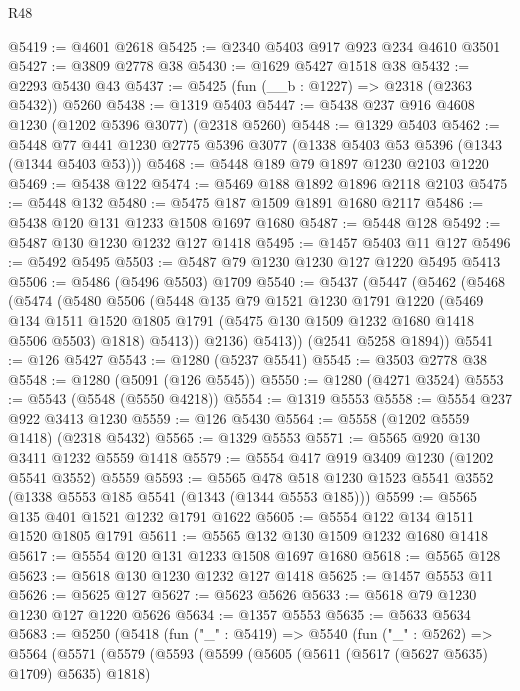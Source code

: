 \begin{lexlean}{R48}
\begin{coremodule}
@5419 := @4601 @2618
@5425 := @2340 @5403 @917 @923 @234 @4610 @3501
@5427 := @3809 @2778 @38
@5430 := @1629 @5427 @1518 @38
@5432 := @2293 @5430 @43
@5437 := @5425 (fun (__b : @1227) => @2318 (@2363 @5432)) @5260
@5438 := @1319 @5403
@5447 := @5438 @237 @916 @4608 @1230 (@1202 @5396 @3077) (@2318 @5260)
@5448 := @1329 @5403
@5462 := @5448 @77 @441 @1230 @2775 @5396 @3077 (@1338 @5403 @53 @5396 (@1343 (@1344 @5403 @53)))
@5468 := @5448 @189 @79 @1897 @1230 @2103 @1220
@5469 := @5438 @122
@5474 := @5469 @188 @1892 @1896 @2118 @2103
@5475 := @5448 @132
@5480 := @5475 @187 @1509 @1891 @1680 @2117
@5486 := @5438 @120 @131 @1233 @1508 @1697 @1680
@5487 := @5448 @128
@5492 := @5487 @130 @1230 @1232 @127 @1418
@5495 := @1457 @5403 @11 @127
@5496 := @5492 @5495
@5503 := @5487 @79 @1230 @1230 @127 @1220 @5495 @5413
@5506 := @5486 (@5496 @5503) @1709
@5540 := @5437
    (@5447
      (@5462
        (@5468
          (@5474
            (@5480
              @5506
              (@5448
                @135
                @79
                @1521
                @1230
                @1791
                @1220
                (@5469
                  @134
                  @1511
                  @1520
                  @1805
                  @1791
                  (@5475 @130 @1509 @1232 @1680 @1418 @5506 @5503)
                  @1818)
                @5413))
            @2136)
          @5413))
      (@2541 @5258 @1894))
@5541 := @126 @5427
@5543 := @1280 (@5237 @5541)
@5545 := @3503 @2778 @38
@5548 := @1280 (@5091 (@126 @5545))
@5550 := @1280 (@4271 @3524)
@5553 := @5543 (@5548 (@5550 @4218))
@5554 := @1319 @5553
@5558 := @5554 @237 @922 @3413 @1230
@5559 := @126 @5430
@5564 := @5558 (@1202 @5559 @1418) (@2318 @5432)
@5565 := @1329 @5553
@5571 := @5565 @920 @130 @3411 @1232 @5559 @1418
@5579 := @5554 @417 @919 @3409 @1230 (@1202 @5541 @3552) @5559
@5593 := @5565 @478 @518 @1230 @1523 @5541 @3552 (@1338 @5553 @185 @5541 (@1343 (@1344 @5553 @185)))
@5599 := @5565 @135 @401 @1521 @1232 @1791 @1622
@5605 := @5554 @122 @134 @1511 @1520 @1805 @1791
@5611 := @5565 @132 @130 @1509 @1232 @1680 @1418
@5617 := @5554 @120 @131 @1233 @1508 @1697 @1680
@5618 := @5565 @128
@5623 := @5618 @130 @1230 @1232 @127 @1418
@5625 := @1457 @5553 @11
@5626 := @5625 @127
@5627 := @5623 @5626
@5633 := @5618 @79 @1230 @1230 @127 @1220 @5626
@5634 := @1357 @5553
@5635 := @5633 @5634
@5683 := @5250
    (@5418
      (fun ("_" : @5419) =>
      @5540
        (fun ("_" : @5262) =>
        @5564
          (@5571
            (@5579
              (@5593
                (@5599
                  (@5605 (@5611 (@5617 (@5627 @5635) @1709) @5635) @1818)

\end{coremodule}
\end{lexlean}
